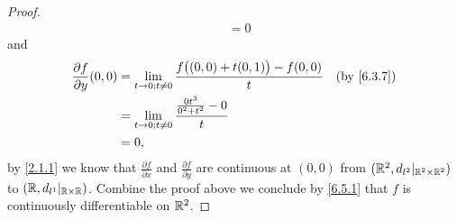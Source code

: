 \begin{proof}
\begin{align*}
                                        & = 0
  \end{align*}
  and
  \begin{align*}
    \frac{\partial f}{\partial y}(0, 0) & = \lim_{t \to 0 ; t \neq 0} \frac{f\big((0, 0) + t(0, 1)\big) - f(0, 0)}{t} & \text{(by \cref{6.3.7})} \\
                                        & = \lim_{t \to 0 ; t \neq 0} \frac{\frac{0 t^3}{0^2 + t^2} - 0}{t}                                      \\
                                        & = 0,
  \end{align*}
  by \cref{2.1.1} we know that \(\frac{\partial f}{\partial x}\) and \(\frac{\partial f}{\partial y}\) are continuous at \((0, 0)\) from \((\mathbb{R}^2, d_{l^2}|_{\mathbb{R}^2 \times \mathbb{R}^2})\) to \((\mathbb{R}, d_{l^1}|_{\mathbb{R} \times \mathbb{R}})\).
  Combine the proof above we conclude by \cref{6.5.1} that \(f\) is continuously differentiable on \(\mathbb{R}^2\).


\end{proof}
